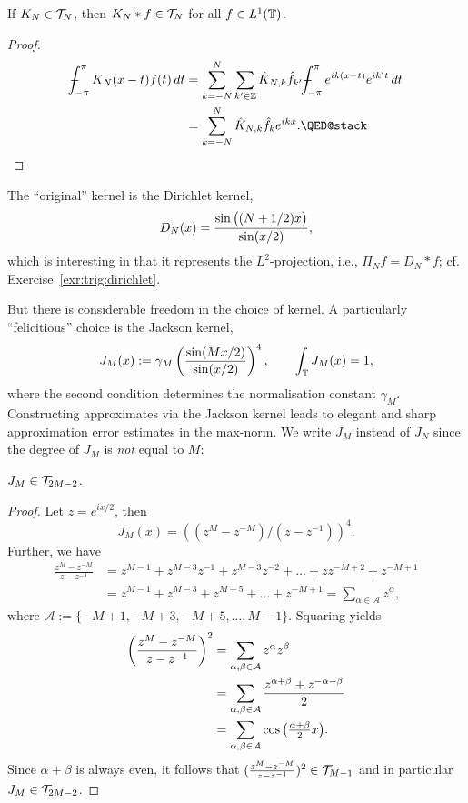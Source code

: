 \begin{lemma}
  If $K_N \in \mathcal{T}_N$, then $K_N \ast f \in \mathcal{T}_N$ for
  all $f \in L^1(\mathbb{T})$.
\end{lemma}
\begin{proof}
  \begin{align*}
    \mint_{-\pi}^\pi K_N(x-t) f(t) \,dt
    &=
    \sum_{k =  -N}^N \sum_{k' \in \Z}
        \hat{K}_{N,k} \hat{f}_{k'} \mint_{-\pi}^\pi e^{ik(x-t)} e^{ik't}\,dt
    \\ &=
    \sum_{k = -N}^N \hat{K}_{N,k} \hat{f}_{k} e^{ikx}. \qedhere
  \end{align*}
\end{proof}


The ``original'' kernel is the Dirichlet kernel,
\[
    D_N(x) = \frac{\sin\big( (N+1/2) x \big)}{ \sin(x/2) },
\]
which is interesting in that it represents the $L^2$-projection, i.e.,
$\Pi_N f = D_N \ast f$; cf. Exercise~\ref{exr:trig:dirichlet}.

But there is considerable freedom in the choice of kernel. A particularly
``felicitious'' choice is the Jackson kernel,
\[
    J_M(x) := \gamma_M \left( \frac{\sin( Mx/2)}{\sin(x/2)} \right)^4,
    \qquad
    \int_{\mathbb{T}} J_M(x) = 1,
\]
where the second condition determines the normalisation constant $\gamma_M$.
Constructing approximates via the Jackson kernel leads to elegant and
sharp approximation error estimates in the max-norm. We write $J_M$ instead of $J_N$ since the degree of $J_M$ is {\em not} equal to $M$:

\begin{lemma}
  $J_M \in \mathcal{T}_{2M-2}$.
\end{lemma}
\begin{proof}
  Let $z = e^{ix/2}$, then
  \[
      J_M(x)
      =
      \left((z^M - z^{-M}) / (z - z^{-1})\right)^4.
  \]
  Further, we have
  \begin{align*}
    \frac{z^M - z^{-M}}{z - z^{-1}}
    &= z^{M-1} + z^{M-3} z^{-1} + z^{M-3} z^{-2} + \dots
      + z z^{-M+2} + z^{-M+1} \\
    &= z^{M-1} + z^{M-3} + z^{M-5} + \dots + z^{-M+1}
    = \sum_{\alpha \in \mathcal{A}} z^\alpha,
  \end{align*}
  where $\mathcal{A} := \{-M+1, -M+3, -M+5, \dots, M-1\}$. Squaring yields
  \begin{align*}
     \left(\frac{z^M - z^{-M}}{z - z^{-1}} \right)^2
     &=
     \sum_{\alpha, \beta \in \mathcal{A}}
     z^\alpha z^{\beta} \\
     &= \sum_{\alpha, \beta \in \mathcal{A}}
     \frac{z^{\alpha +\beta} + z^{-\alpha-\beta}}{2} \\
     &= \sum_{\alpha, \beta \in \mathcal{A}} \cos\big( {\textstyle \frac{\alpha+\beta}{2}} x \big).
   \end{align*}
   Since $\alpha+\beta$ is always even, it follows that
   $(\frac{z^M - z^{-M}}{z - z^{-1}} )^2 \in \mathcal{T}_{M-1}$ and in particular
   $J_M \in \mathcal{T}_{2M-2}$.
\end{proof}



